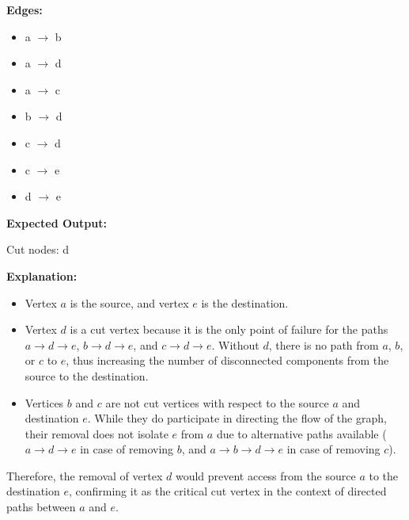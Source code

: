 \documentclass{article}
\begin{document}
        \textbf{Edges:}
        \begin{itemize}
            \item a $\rightarrow$ b
            \item a $\rightarrow$ d
            \item a $\rightarrow$ c
            \item b $\rightarrow$ d
            \item c $\rightarrow$ d
            \item c $\rightarrow$ e
            \item d $\rightarrow$ e
        \end{itemize}
        
        \textbf{Expected Output:}
        
        Cut nodes: d
        
        \textbf{Explanation:}
        
        \begin{itemize}
            \item Vertex $a$ is the source, and vertex $e$ is the destination.
            \item Vertex $d$ is a cut vertex because it is the only point of failure for the paths $a \rightarrow d \rightarrow e$, $b \rightarrow d \rightarrow e$, and $c \rightarrow d \rightarrow e$. Without $d$, there is no path from $a$, $b$, or $c$ to $e$, thus increasing the number of disconnected components from the source to the destination.
            \item Vertices $b$ and $c$ are not cut vertices with respect to the source $a$ and destination $e$. While they do participate in directing the flow of the graph, their removal does not isolate $e$ from $a$ due to alternative paths available ($a \rightarrow d \rightarrow e$ in case of removing $b$, and $a \rightarrow b \rightarrow d \rightarrow e$ in case of removing $c$).
        \end{itemize}
        
        Therefore, the removal of vertex $d$ would prevent access from the source $a$ to the destination $e$, confirming it as the critical cut vertex in the context of directed paths between $a$ and $e$.
\end{document}
